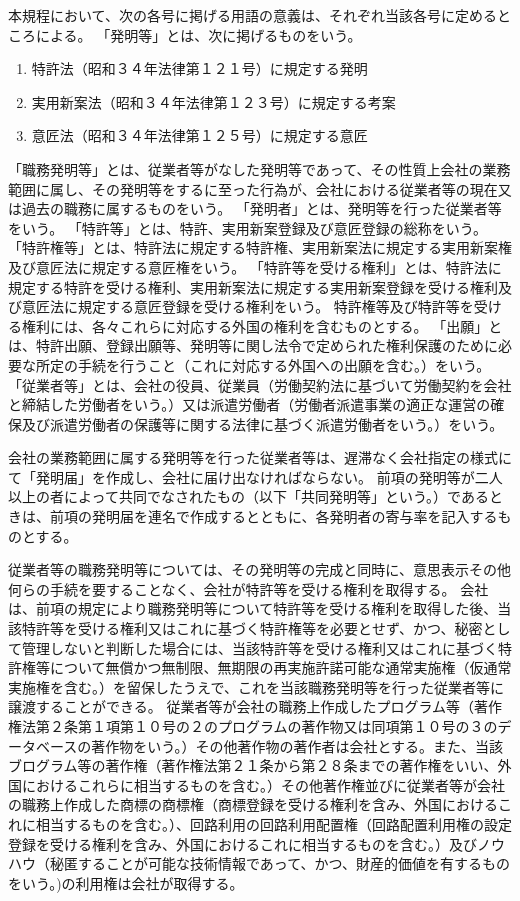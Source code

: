 \documentclass[10pt,a4paper,uplatex]{jsarticle}
\begin{document}
本規程において、次の各号に掲げる用語の意義は、それぞれ当該各号に定めるところによる。
\term 「発明等」とは、次に掲げるものをいう。
\begin{enumerate}
    \item 特許法（昭和３４年法律第１２１号）に規定する発明
    \item 実用新案法（昭和３４年法律第１２３号）に規定する考案
    \item 意匠法（昭和３４年法律第１２５号）に規定する意匠
\end{enumerate}
\term 「職務発明等」とは、従業者等がなした発明等であって、その性質上会社の業務範囲に属し、その発明等をするに至った行為が、会社における従業者等の現在又は過去の職務に属するものをいう。
\term 「発明者」とは、発明等を行った従業者等をいう。
\term 「特許等」とは、特許、実用新案登録及び意匠登録の総称をいう。
\term 「特許権等」とは、特許法に規定する特許権、実用新案法に規定する実用新案権及び意匠法に規定する意匠権をいう。
\term 「特許等を受ける権利」とは、特許法に規定する特許を受ける権利、実用新案法に規定する実用新案登録を受ける権利及び意匠法に規定する意匠登録を受ける権利をいう。
\term 特許権等及び特許等を受ける権利には、各々これらに対応する外国の権利を含むものとする。
\term 「出願」とは、特許出願、登録出願等、発明等に関し法令で定められた権利保護のために必要な所定の手続を行うこと（これに対応する外国への出願を含む。）をいう。
\term 「従業者等」とは、会社の役員、従業員（労働契約法に基づいて労働契約を会社と締結した労働者をいう。）又は派遣労働者（労働者派遣事業の適正な運営の確保及び派遣労働者の保護等に関する法律に基づく派遣労働者をいう。）をいう。

会社の業務範囲に属する発明等を行った従業者等は、遅滞なく会社指定の様式にて「発明届」を作成し、会社に届け出なければならない。
\label{para:invention_notice}
\term 前項の発明等が二人以上の者によって共同でなされたもの（以下「共同発明等」という。）であるときは、前項の発明届を連名で作成するとともに、各発明者の寄与率を記入するものとする。

従業者等の職務発明等については、その発明等の完成と同時に、意思表示その他何らの手続を要することなく、会社が特許等を受ける権利を取得する。
\term 会社は、前項の規定により職務発明等について特許等を受ける権利を取得した後、当該特許等を受ける権利又はこれに基づく特許権等を必要とせず、かつ、秘密として管理しないと判断した場合には、当該特許等を受ける権利又はこれに基づく特許権等について無償かつ無制限、無期限の再実施許諾可能な通常実施権（仮通常実施権を含む。）を留保したうえで、これを当該職務発明等を行った従業者等に譲渡することができる。
\term 従業者等が会社の職務上作成したプログラム等（著作権法第２条第１項第１０号の２のプログラムの著作物又は同項第１０号の３のデータベースの著作物をいう。）その他著作物の著作者は会社とする。また、当該ブログラム等の著作権（著作権法第２１条から第２８条までの著作権をいい、外国におけるこれらに相当するものを含む。）その他著作権並びに従業者等が会社の職務上作成した商標の商標権（商標登録を受ける権利を含み、外国におけるこれに相当するものを含む。）、回路利用の回路利用配置権（回路配置利用権の設定登録を受ける権利を含み、外国におけるこれに相当するものを含む。）及びノウハウ（秘匿することが可能な技術情報であって、かつ、財産的価値を有するものをいう。)の利用権は会社が取得する。
\end{document}
